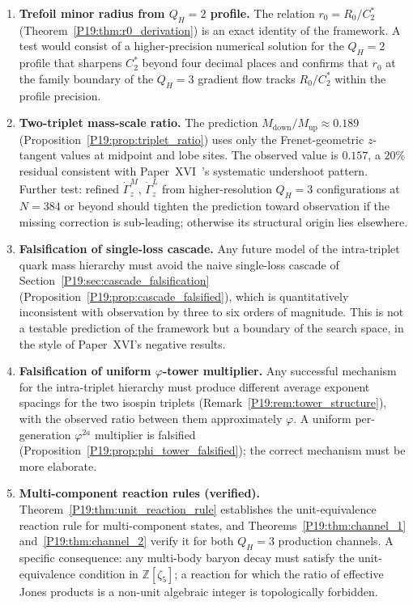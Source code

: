 \documentclass[11pt,a4paper]{article}
\theoremstyle{definition}\newtheorem{definition}[theorem]{Definition}
\theoremstyle{remark}
\newcommand{\vp}{\varphi}
\newcommand{\QH}{Q_H}
\newcommand{\tang}{\dot\Gamma}
\begin{document}
\begin{enumerate}[leftmargin=2em,label=\textbf{P\arabic*.}]

\item \textbf{Trefoil minor radius from $\QH=2$ profile.}
The relation $r_0=R_0/C_2^*$ (Theorem~\ref{P19:thm:r0_derivation}) is
an exact identity of the framework.  A test would consist of a
higher-precision numerical solution for the $\QH=2$ profile that
sharpens $C_2^*$ beyond four decimal places and confirms that
$r_0$ at the family boundary of the $\QH=3$ gradient flow tracks
$R_0/C_2^*$ within the profile precision.

\item \textbf{Two-triplet mass-scale ratio.}
The prediction $M_{\mathrm{down}}/M_{\mathrm{up}}\approx 0.189$
(Proposition~\ref{P19:prop:triplet_ratio}) uses only the
Frenet-geometric $z$-tangent values at midpoint and lobe sites.
The observed value is $0.157$, a $20\%$ residual consistent
with Paper~XVI~\cite{Paper16}'s systematic undershoot pattern.
Further test: refined $\tang_z^M$, $\tang_z^L$ from higher-resolution
$\QH=3$ configurations at $N=384$ or beyond should tighten the
prediction toward observation if the missing correction is
sub-leading; otherwise its structural origin lies elsewhere.

\item \textbf{Falsification of single-loss cascade.}
Any future model of the intra-triplet quark mass hierarchy must
avoid the naive single-loss cascade of
Section~\ref{P19:sec:cascade_falsification}
(Proposition~\ref{P19:prop:cascade_falsified}), which is quantitatively
inconsistent with observation by three to six orders of magnitude.
This is not a testable prediction of the framework but a boundary
of the search space, in the style of Paper~XVI's negative results.

\item \textbf{Falsification of uniform $\vp$-tower multiplier.}
Any successful mechanism for the intra-triplet hierarchy must
produce different average exponent spacings for the two isospin
triplets (Remark~\ref{P19:rem:tower_structure}), with the observed
ratio between them approximately $\vp$.  A uniform per-generation
$\vp^{2a}$ multiplier is falsified
(Proposition~\ref{P19:prop:phi_tower_falsified}); the correct
mechanism must be more elaborate.

\item \textbf{Multi-component reaction rules (verified).}
Theorem~\ref{P19:thm:unit_reaction_rule} establishes the
unit-equivalence reaction rule for multi-component states, and
Theorems~\ref{P19:thm:channel_1} and~\ref{P19:thm:channel_2} verify it
for both $\QH=3$ production channels.  A specific consequence:
any multi-body baryon decay must satisfy the unit-equivalence
condition in $\mathbb{Z}[\zeta_5]$; a reaction for which the
ratio of effective Jones products is a non-unit algebraic integer
is topologically forbidden.

\end{enumerate}
\end{document}
